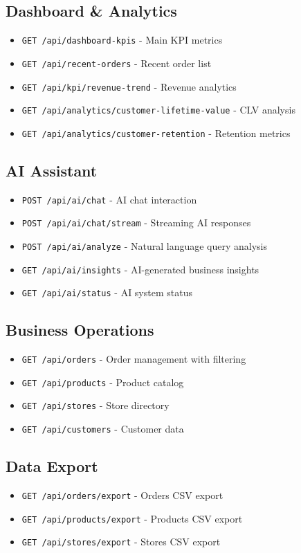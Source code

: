 \documentclass[11pt,a4paper]{article}
\begin{document}
\subsection{Dashboard \& Analytics}
\begin{itemize}[leftmargin=*]
    \item \texttt{GET /api/dashboard-kpis} - Main KPI metrics
    \item \texttt{GET /api/recent-orders} - Recent order list
    \item \texttt{GET /api/kpi/revenue-trend} - Revenue analytics
    \item \texttt{GET /api/analytics/customer-lifetime-value} - CLV analysis
    \item \texttt{GET /api/analytics/customer-retention} - Retention metrics
\end{itemize}

\subsection{AI Assistant}
\begin{itemize}[leftmargin=*]
    \item \texttt{POST /api/ai/chat} - AI chat interaction
    \item \texttt{POST /api/ai/chat/stream} - Streaming AI responses
    \item \texttt{POST /api/ai/analyze} - Natural language query analysis
    \item \texttt{GET /api/ai/insights} - AI-generated business insights
    \item \texttt{GET /api/ai/status} - AI system status
\end{itemize}

\subsection{Business Operations}
\begin{itemize}[leftmargin=*]
    \item \texttt{GET /api/orders} - Order management with filtering
    \item \texttt{GET /api/products} - Product catalog
    \item \texttt{GET /api/stores} - Store directory
    \item \texttt{GET /api/customers} - Customer data
\end{itemize}

\subsection{Data Export}
\begin{itemize}[leftmargin=*]
    \item \texttt{GET /api/orders/export} - Orders CSV export
    \item \texttt{GET /api/products/export} - Products CSV export
    \item \texttt{GET /api/stores/export} - Stores CSV export
\end{itemize}
\end{document}
